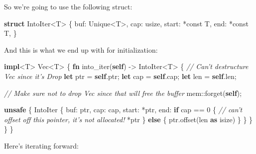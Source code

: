 \documentclass[a4paper,]{book}
\newenvironment{Shaded}{\begin{snugshade}}{\end{snugshade}}
\newcommand{\KeywordTok}[1]{\textcolor[rgb]{0.13,0.29,0.53}{\textbf{{#1}}}}
\newcommand{\DecValTok}[1]{\textcolor[rgb]{0.00,0.00,0.81}{{#1}}}
\newcommand{\CommentTok}[1]{\textcolor[rgb]{0.56,0.35,0.01}{\textit{{#1}}}}
\newcommand{\NormalTok}[1]{{#1}}
\begin{document}
So we're going to use the following struct:

\begin{Shaded}
\begin{Highlighting}[]
\KeywordTok{struct} \NormalTok{IntoIter<T> \{}
    \NormalTok{buf: Unique<T>,}
    \NormalTok{cap: usize,}
    \NormalTok{start: *const T,}
    \NormalTok{end: *const T,}
\NormalTok{\}}
\end{Highlighting}
\end{Shaded}

And this is what we end up with for initialization:

\begin{Shaded}
\begin{Highlighting}[]
\KeywordTok{impl}\NormalTok{<T> Vec<T> \{}
    \KeywordTok{fn} \NormalTok{into_iter(}\KeywordTok{self}\NormalTok{) -> IntoIter<T> \{}
        \CommentTok{// Can't destructure Vec since it's Drop}
        \KeywordTok{let} \NormalTok{ptr = }\KeywordTok{self}\NormalTok{.ptr;}
        \KeywordTok{let} \NormalTok{cap = }\KeywordTok{self}\NormalTok{.cap;}
        \KeywordTok{let} \NormalTok{len = }\KeywordTok{self}\NormalTok{.len;}

        \CommentTok{// Make sure not to drop Vec since that will free the buffer}
        \NormalTok{mem::forget(}\KeywordTok{self}\NormalTok{);}

        \KeywordTok{unsafe} \NormalTok{\{}
            \NormalTok{IntoIter \{}
                \NormalTok{buf: ptr,}
                \NormalTok{cap: cap,}
                \NormalTok{start: *ptr,}
                \NormalTok{end: }\KeywordTok{if} \NormalTok{cap == }\DecValTok{0} \NormalTok{\{}
                    \CommentTok{// can't offset off this pointer, it's not allocated!}
                    \NormalTok{*ptr}
                \NormalTok{\} }\KeywordTok{else} \NormalTok{\{}
                    \NormalTok{ptr.offset(len }\KeywordTok{as} \NormalTok{isize)}
                \NormalTok{\}}
            \NormalTok{\}}
        \NormalTok{\}}
    \NormalTok{\}}
\NormalTok{\}}
\end{Highlighting}
\end{Shaded}

Here's iterating forward:
\end{document}
